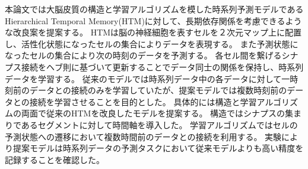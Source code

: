 \abstract
本論文では大脳皮質の構造と学習アルゴリズムを模した時系列予測モデルであるHierarchical Temporal Memory(HTM)に対して、長期依存関係を考慮できるような改良案を提案する。
HTMは脳の神経細胞を表すセルを２次元マップ上に配置し、活性化状態になったセルの集合によりデータを表現する。
また予測状態になったセルの集合により次の時刻のデータを予測する。
各セル間を繋げるシナプス接続をヘブ則に基づいて更新することでデータ同士の関係を保持し、時系列データを学習する。
従来のモデルでは時系列データ中の各データに対して一時刻前のデータとの接続のみを学習していたが、提案モデルでは複数時刻前のデータとの接続を学習させることを目的とした。
具体的には構造と学習アルゴリズムの両面で従来のHTMを改良したモデルを提案する。
構造ではシナプスの集まりであるセグメントに対して時間軸を導入した。
学習アルゴリズムではセルの予測状態への遷移において複数時間前のデータとの接続を利用する。
実験により提案モデルは時系列データの予測タスクにおいて従来モデルよりも高い精度を記録することを確認した。
